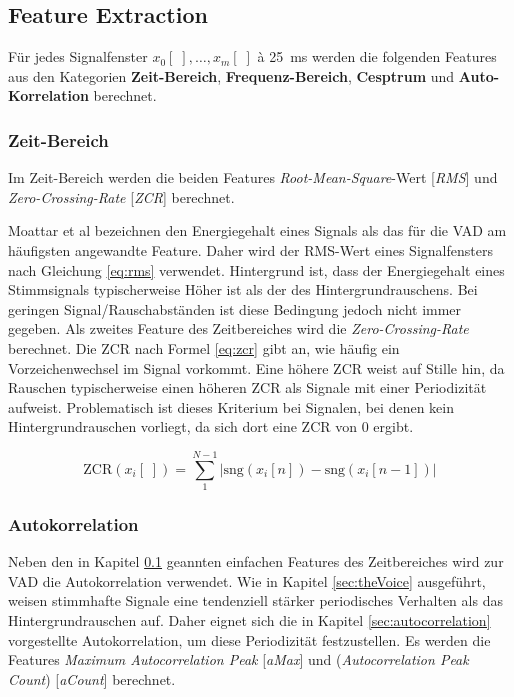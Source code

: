 \subsection{Feature Extraction}
\label{sec:featExtraction}

Für jedes Signalfenster $x_0[\;] , \ldots , x_m[\;]$ à \SI{25}{\milli\second} werden die folgenden Features aus den Kategorien \textbf{Zeit-Bereich}, \textbf{Frequenz-Bereich}, \textbf{Cesptrum} und \textbf{Auto-Korrelation} berechnet.

\subsubsection{Zeit-Bereich}
\label{sec:timeFeats}

Im Zeit-Bereich werden die beiden Features \emph{Root-Mean-Square}-Wert [\emph{RMS}] und \emph{Zero-Crossing-Rate} [\emph{ZCR}] berechnet. 

Moattar et al \cite{vad_Easy} bezeichnen den Energiegehalt eines Signals als das für die VAD am häufigsten angewandte Feature. Daher wird der RMS-Wert eines Signalfensters nach Gleichung \ref{eq:rms} verwendet. Hintergrund ist, dass der Energiegehalt eines Stimmsignals typischerweise Höher ist als der des Hintergrundrauschens. Bei geringen Signal/Rauschabständen ist diese Bedingung jedoch nicht immer gegeben. Als zweites Feature des Zeitbereiches wird die \emph{Zero-Crossing-Rate} berechnet. Die ZCR nach Formel \ref{eq:zcr} gibt an, wie häufig ein Vorzeichenwechsel im Signal vorkommt. Eine höhere ZCR weist auf Stille hin, da Rauschen typischerweise einen höheren ZCR als Signale mit einer Periodizität aufweist. Problematisch ist dieses Kriterium bei Signalen, bei denen kein Hintergrundrauschen vorliegt, da sich dort eine ZCR von 0 ergibt.\cite{vad_ceps} 

\begin{equation}
\text{ZCR}(x_i[\;]) = \sum_{1}^{N-1}|\text{sng}(x_i[n])-\text{sng}(x_i[n-1])|
\label{eq:zcr}
\end{equation}

\subsubsection{Autokorrelation}

Neben den in Kapitel \ref{sec:featExtraction} geannten \glqq einfachen\grqq{} Features des Zeitbereiches wird zur VAD die Autokorrelation verwendet. Wie in Kapitel \ref{sec:theVoice} ausgeführt, weisen stimmhafte Signale eine tendenziell stärker periodisches Verhalten als das Hintergrundrauschen auf. Daher eignet sich die in Kapitel \ref{sec:autocorrelation} vorgestellte Autokorrelation, um diese Periodizität festzustellen. Es werden die Features \emph{Maximum Autocorrelation Peak} [\emph{aMax}] und (\emph{Autocorrelation Peak Count}) [\emph{aCount}] berechnet. 

